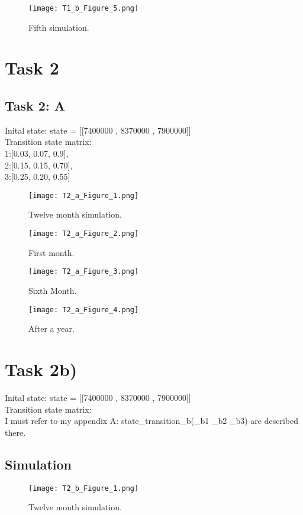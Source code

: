 \documentclass[a4paper]{article}
\begin{document}
\begin{figure}[H]
\centering
\texttt{[image: T1\_b\_Figure\_5.png]}
\caption{\label{fig:table}Fifth simulation.}
\end{figure}

\newpage 
\section{Task 2}
\subsection{Task 2: A}

Inital state: state = [[7400000 ,  8370000 ,  7900000]] \\
Transition state matrix: \\
1:[0.03, 0.07, 0.9], \\
2:[0.15, 0.15, 0.70], \\
3:[0.25, 0.20, 0.55]

\begin{figure}[H]
\centering
\texttt{[image: T2\_a\_Figure\_1.png]}
\caption{\label{fig:table}Twelve month simulation.}
\end{figure}

\begin{figure}[H]
\centering
\texttt{[image: T2\_a\_Figure\_2.png]}
\caption{\label{fig:table}First month.}
\end{figure}

\begin{figure}[H]
\centering
\texttt{[image: T2\_a\_Figure\_3.png]}
\caption{\label{fig:table}Sixth Month.}
\end{figure}

\begin{figure}[H]
\centering
\texttt{[image: T2\_a\_Figure\_4.png]}
\caption{\label{fig:table}After a year.}
\end{figure}
\newpage
\section{Task 2b)}
Inital state: state = [[7400000 ,  8370000 ,  7900000]] \\
Transition state matrix: \\
I must refer to my appendix A: state\_transition\_b(\_b1 \_b2 \_b3)
are described there.
\subsection{Simulation}
\begin{figure}[H]
\centering
\texttt{[image: T2\_b\_Figure\_1.png]}
\caption{\label{fig:table}Twelve month simulation.}
\end{figure}
\end{document}
